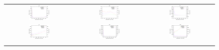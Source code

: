 \documentclass[review,3p]{elsarticle}
\begin{document}
\begin{figure}[!t]
\centering
\begin{tabular}{ccc}
  \includegraphics[width=0.32\textwidth]{images/HighMutRatio_150000/F2_50_HighMutRatio.eps} & \includegraphics[width=0.32\textwidth]{images/HighMutRatio_150000/F3_50_HighMutRatio} & \includegraphics[width=0.32\textwidth]{images/HighMutRatio_150000/F4_50_HighMutRatio} \\
  \includegraphics[width=0.32\textwidth]{images/HighMutRatio_150000/F8_50_HighMutRatio} & \includegraphics[width=0.32\textwidth]{images/HighMutRatio_150000/F9_50_HighMutRatio} & \includegraphics[width=0.32\textwidth]{images/HighMutRatio_150000/F10_50_HighMutRatio} \\ \\

\end{tabular}
\end{figure}
\end{document}
